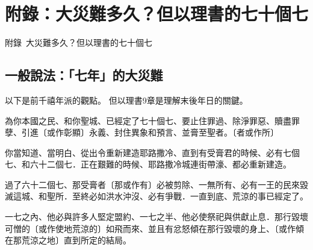 




\renewcommand{\appendixname}{附錄}
\renewcommand{\thechapter}{\arabic{chapter}}
\renewcommand{\thefigure}{\appendixname~\thechapter.\arabic{figure}}  %

\chapter*{附錄：大災難多久？但以理書的七十個七}
%
  {\appendixname~\thechapter\quad 大災難多久？但以理書的七十個七}





\section*{一般說法：「七年」的大災難}
以下是前千禧年派的觀點。
但以理書9章是理解末後年日的關鍵。
\begin{ScriptureBox}

\item[9:24] 為你本國之民、和你聖城、已經定了七十個七、要止住罪過、除淨罪惡、贖盡罪孽、引進〔或作彰顯〕永義、封住異象和預言、並膏至聖者。〔者或作所〕
\item[9:25] 你當知道、當明白、從出令重新建造耶路撒冷、直到有受膏君的時候、必有七個七、和六十二個七．正在艱難的時候、耶路撒冷城連街帶濠、都必重新建造。
\item[9:26] 過了六十二個七、那受膏者〔那或作有〕必被剪除、一無所有、必有一王的民來毀滅這城、和聖所．至終必如洪水沖沒、必有爭戰．一直到底、荒涼的事已經定了。
\item[9:27] 一七之內、他必與許多人堅定盟約、一七之半、他必使祭祀與供獻止息．那行毀壞可憎的〔或作使地荒涼的〕如飛而來、並且有忿怒傾在那行毀壞的身上、〔或作傾在那荒涼之地〕直到所定的結局。

\end{ScriptureBox}

